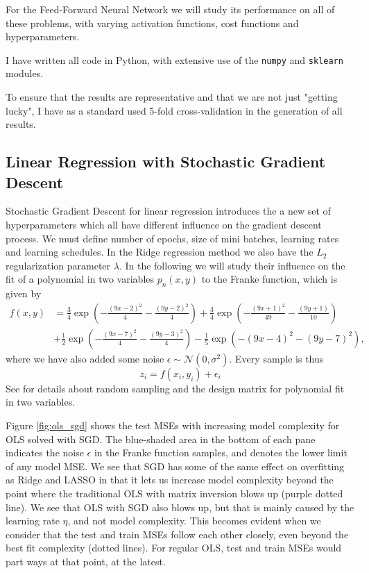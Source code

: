 \documentclass[]{article}
\begin{document}
For the Feed-Forward Neural Network we will study its performance on all of these problems, with varying activation functions, cost functions and hyperparameters.

I have written all code in Python, with extensive use of the \lstinline|numpy| and \lstinline|sklearn| modules.

To ensure that the results are representative and that we are not just "getting lucky", I have as a standard used 5-fold cross-validation in the generation of all results.

\subsection{Linear Regression with Stochastic Gradient Descent}

Stochastic Gradient Descent for linear regression introduces the a new set of hyperparameters which all have different influence on the gradient descent process. We must define number of epochs, size of mini batches, learning rates and learning schedules. In the Ridge regression method we also have the $L_2$ regularization parameter $\lambda$. In the following we will study their influence on the fit of a polynomial in two variables $p_n(x,y)$ to the Franke function, which is given by
\begin{equation}
\label{franke}
	\begin{aligned}
		f(x,y) &= \frac{3}{4}\exp{\left(-\frac{(9x-2)^2}{4} - \frac{(9y-2)^2}{4}\right)}+\frac{3}{4}\exp{\left(-\frac{(9x+1)^2}{49}- \frac{(9y+1)}{10}\right)} \\
		&+\frac{1}{2}\exp{\left(-\frac{(9x-7)^2}{4} - \frac{(9y-3)^2}{4}\right)} -\frac{1}{5}\exp{\left(-(9x-4)^2 - (9y-7)^2\right) },
	\end{aligned}
\end{equation}
where we have also added some noise $\epsilon \sim \mathcal{N}(0, \sigma^2)$. Every sample is thus
\begin{equation}
	z_i = f(x_i, y_i) + \epsilon_i
\end{equation}
See \cite{project1} for details about random sampling and the design matrix for polynomial fit in two variables.

Figure \ref{fig:ols_sgd} shows the test MSEs with increasing model complexity for OLS solved with SGD. The blue-shaded area in the bottom of each pane indicates the noise $\epsilon$ in the Franke function samples, and denotes the lower limit of any model MSE. We see that SGD has some of the same effect on overfitting as Ridge and LASSO in that it lets us increase model complexity beyond the point where the traditional OLS with matrix inversion blows up (purple dotted line). We see that OLS with SGD also blows up, but that is mainly caused by the learning rate $\eta$, and not model complexity. This becomes evident when we consider that the test and train MSEs follow each other closely, even beyond the best fit complexity (dotted lines). For regular OLS, test and train MSEs would part ways at that point, at the latest.
\end{document}
